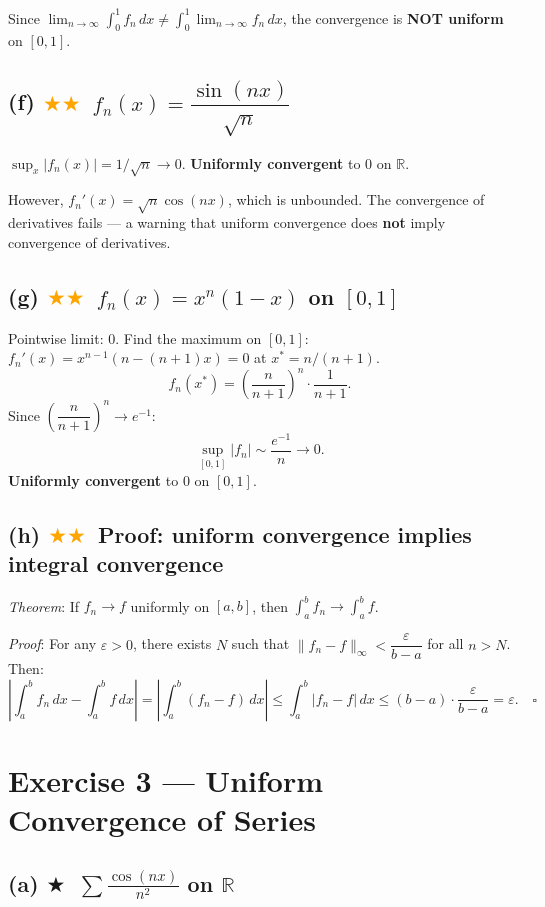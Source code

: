 \documentclass[12pt,a4paper]{article}
\newcommand{\easy}{\textcolor{green!60!black}{$\bigstar$}}
\newcommand{\medium}{\textcolor{orange}{$\bigstar\bigstar$}}
\begin{document}
Since $\displaystyle\lim_{n\to\infty}\int_0^1 f_n\,dx \neq \int_0^1\lim_{n\to\infty}f_n\,dx$, the convergence is \textbf{NOT uniform} on $[0,1]$.

\subsection*{(f) \medium\ $f_n(x)=\dfrac{\sin(nx)}{\sqrt{n}}$}

$\sup_x|f_n(x)|=1/\sqrt{n}\to 0$.  \textbf{Uniformly convergent} to $0$ on $\mathbb{R}$.

However, $f_n'(x)=\sqrt{n}\cos(nx)$, which is unbounded.  The convergence of derivatives fails — a warning that uniform convergence does \textbf{not} imply convergence of derivatives.

\subsection*{(g) \medium\ $f_n(x)=x^n(1-x)$ on $[0,1]$}

Pointwise limit: $0$.  Find the maximum on $[0,1]$:
$f_n'(x)=x^{n-1}(n-(n+1)x)=0$ at $x^*=n/(n+1)$.
\[
  f_n(x^*) = \left(\frac{n}{n+1}\right)^n\cdot\frac{1}{n+1}.
\]
Since $\left(\dfrac{n}{n+1}\right)^n\to e^{-1}$:
\[
  \sup_{[0,1]}|f_n|\sim\frac{e^{-1}}{n}\to 0.
\]
\textbf{Uniformly convergent} to $0$ on $[0,1]$.

\subsection*{(h) \medium\ Proof: uniform convergence implies integral convergence}

\textit{Theorem}: If $f_n\to f$ uniformly on $[a,b]$, then $\int_a^b f_n\to\int_a^b f$.

\textit{Proof}: For any $\varepsilon>0$, there exists $N$ such that $\|f_n-f\|_\infty<\dfrac{\varepsilon}{b-a}$ for all $n>N$.  Then:
\[
  \left|\int_a^b f_n\,dx - \int_a^b f\,dx\right|
  = \left|\int_a^b(f_n-f)\,dx\right|
  \leq \int_a^b|f_n-f|\,dx
  \leq (b-a)\cdot\frac{\varepsilon}{b-a} = \varepsilon. \quad\square
\]

\section*{Exercise 3 — Uniform Convergence of Series}

\subsection*{(a) \easy\ $\displaystyle\sum\frac{\cos(nx)}{n^2}$ on $\mathbb{R}$}
\end{document}

